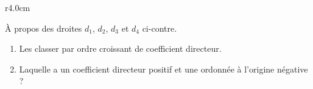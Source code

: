 
\begin{exercice}\label{exosmath-0494}

\begin{wrapfigure}{r}{4.0cm}
   \vspace{-0.5cm}        %
   \centering
   
\end{wrapfigure}

À propos des droites \( d_1\), \( d_2\), \( d_3\) et \( d_4\) ci-contre.
\begin{enumerate}
    \item
        Les classer par ordre croissant de coefficient directeur. 
    \item
        Laquelle a un coefficient directeur positif et une ordonnée à l'origine négative ?
\end{enumerate}

\end{exercice}
